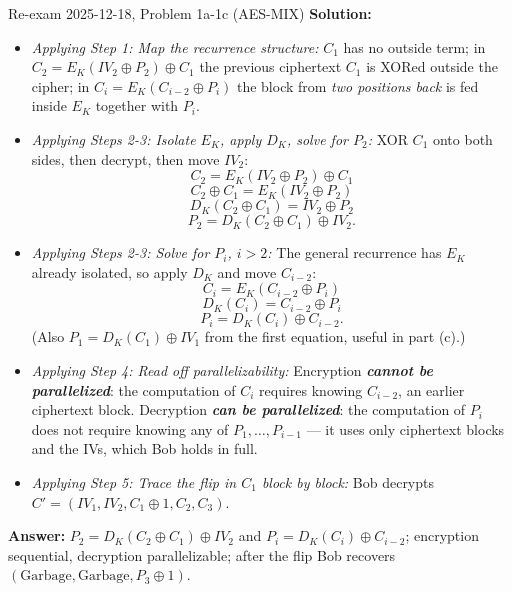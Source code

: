 \documentclass[12pt, a4paper]{article}
\newcommand{\term}[1]{\textbf{\textit{#1}}}        %
\begin{document}
\begin{practicebox}{Re-exam 2025-12-18, Problem 1a-1c (AES-MIX)}
\textbf{Solution:}
\begin{itemize}
    \item \textit{Applying Step 1: Map the recurrence structure:} $C_1$ has no outside term; in $C_2 = E_K(IV_2 \oplus P_2) \oplus C_1$ the previous ciphertext $C_1$ is XORed outside the cipher; in $C_i = E_K(C_{i-2} \oplus P_i)$ the block from \emph{two positions back} is fed inside $E_K$ together with $P_i$.
    \item \textit{Applying Steps 2-3: Isolate $E_K$, apply $D_K$, solve for $P_2$:} XOR $C_1$ onto both sides, then decrypt, then move $IV_2$: \[ C_2 = E_K(IV_2 \oplus P_2) \oplus C_1 \] \[ C_2 \oplus C_1 = E_K(IV_2 \oplus P_2) \] \[ D_K(C_2 \oplus C_1) = IV_2 \oplus P_2 \] \[ P_2 = D_K(C_2 \oplus C_1) \oplus IV_2. \]
    \item \textit{Applying Steps 2-3: Solve for $P_i$, $i > 2$:} The general recurrence has $E_K$ already isolated, so apply $D_K$ and move $C_{i-2}$: \[ C_i = E_K(C_{i-2} \oplus P_i) \] \[ D_K(C_i) = C_{i-2} \oplus P_i \] \[ P_i = D_K(C_i) \oplus C_{i-2}. \] (Also $P_1 = D_K(C_1) \oplus IV_1$ from the first equation, useful in part (c).)
    \item \textit{Applying Step 4: Read off parallelizability:} Encryption \term{cannot be parallelized}: the computation of $C_i$ requires knowing $C_{i-2}$, an earlier ciphertext block. Decryption \term{can be parallelized}: the computation of $P_i$ does not require knowing any of $P_1, \dots, P_{i-1}$ --- it uses only ciphertext blocks and the IVs, which Bob holds in full.
    \item \textit{Applying Step 5: Trace the flip in $C_1$ block by block:} Bob decrypts $C' = (IV_1, IV_2, C_1 \oplus 1, C_2, C_3)$. 
\end{itemize}
\textbf{Answer:} $P_2 = D_K(C_2 \oplus C_1) \oplus IV_2$ and $P_i = D_K(C_i) \oplus C_{i-2}$; encryption sequential, decryption parallelizable; after the flip Bob recovers $(\text{Garbage}, \text{Garbage}, P_3 \oplus 1)$.
\end{practicebox}
\end{document}
